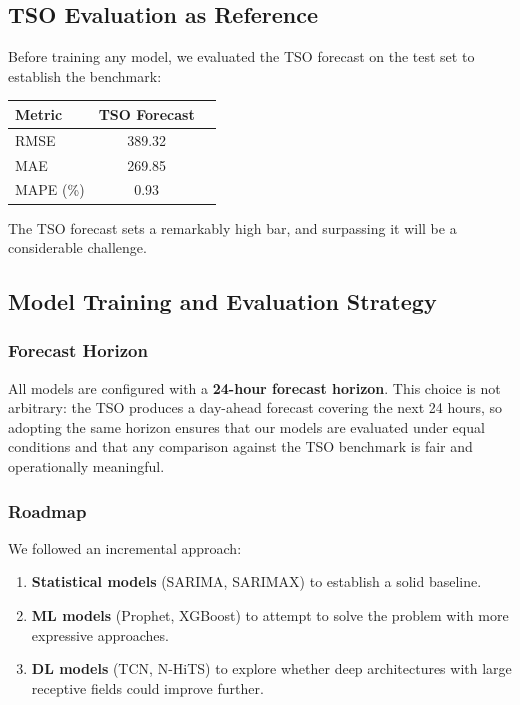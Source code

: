 \documentclass[11pt,a4paper]{article}
\begin{document}
\subsection{TSO Evaluation as Reference}

Before training any model, we evaluated the TSO forecast on the test set to establish the benchmark:

\begin{center}
\begin{tabular}{lcc}
\toprule
\textbf{Metric} & \textbf{TSO Forecast} \\
\midrule
RMSE & 389.32 \\
MAE & 269.85 \\
MAPE (\%) & 0.93 \\
\bottomrule
\end{tabular}
\end{center}

The TSO forecast sets a remarkably high bar, and surpassing it will be a considerable challenge.

\subsection{Model Training and Evaluation Strategy}

\subsubsection{Forecast Horizon}

All models are configured with a \textbf{24-hour forecast horizon}. This choice is not arbitrary: the TSO produces a day-ahead forecast covering the next 24 hours, so adopting the same horizon ensures that our models are evaluated under equal conditions and that any comparison against the TSO benchmark is fair and operationally meaningful.

\subsubsection{Roadmap}

We followed an incremental approach:
\begin{enumerate}[nosep]
    \item \textbf{Statistical models} (SARIMA, SARIMAX) to establish a solid baseline.
    \item \textbf{ML models} (Prophet, XGBoost) to attempt to solve the problem with more expressive approaches.
    \item \textbf{DL models} (TCN, N-HiTS) to explore whether deep architectures with large receptive fields could improve further.
\end{enumerate}
\end{document}
